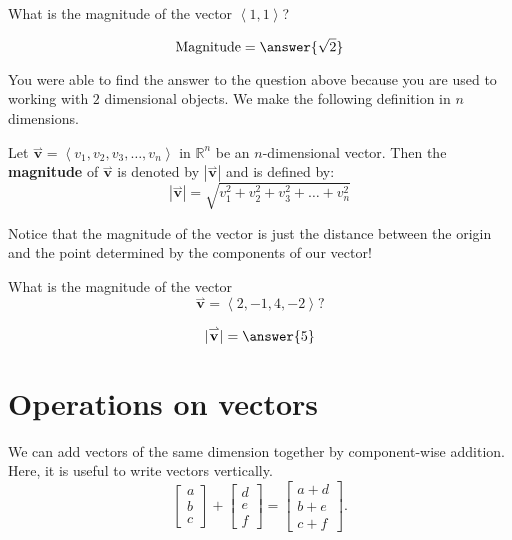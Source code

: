 \documentclass{ximera}
\begin{document}
\begin{question}
  What is the magnitude of the vector $\left\langle 1,1 \right\rangle$?
  \begin{prompt}
    \[
    \text{Magnitude}  = \answer{\sqrt{2}}
    \]
  \end{prompt}
\end{question}

You were able to find the answer to the question above because you are
used to working with $2$ dimensional objects.  We make the following
definition in $n$ dimensions.

\begin{definition}
  Let $\overset{\rightharpoonup}{\mathbf{v}} = \left\langle v_1, v_2, v_3, \dots, v_n \right\rangle$ in $\mathbb{R}^n$
        be an $n$-dimensional vector.  Then the \textbf{magnitude} of
        $\overset{\rightharpoonup}{\mathbf{v}}$ is denoted by $|\overset{\rightharpoonup}{\mathbf{v}}|$ and is defined by:
  \[
  |\overset{\rightharpoonup}{\mathbf{v}}| = \sqrt{v_1^2+v_2^2+v_3^2+\dots+v_n^2}
  \]
\end{definition}

Notice that the magnitude of the vector is just the distance between 
the origin and the point determined by the components of our vector!

\begin{question}
  What is the magnitude of the vector
  \[
  \overset{\rightharpoonup}{\mathbf{v}}=\left\langle 2,-1,4,-2 \right\rangle?
  \]
  \begin{prompt}
    \[
    |\overset{\rightharpoonup}{\mathbf{v}}|=\answer{5}
    \]
  \end{prompt}
\end{question}








\section{Operations on vectors}


We can add vectors of the same dimension together by component-wise
addition. Here, it is useful to write vectors vertically.
\[
\begin{bmatrix}
  a\\
  b\\
  c
\end{bmatrix}
+
\begin{bmatrix}
  d\\
  e\\
  f
\end{bmatrix}
=
\begin{bmatrix}
  a+d\\
  b+e\\
  c+f
\end{bmatrix}.
\]
\end{document}
